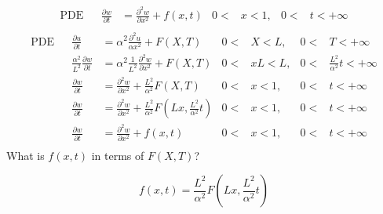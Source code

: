 \documentclass{article}
\begin{document}
\begin{enumerate}[(a)]
\begin{align*}
  \text{PDE}&&\frac{\partial w}{\partial t}&=\frac{\partial^2 w}{\partial x^2}+f(x,t)&0<&x<1,&0<&t<+\infty\\
\end{align*}
\begin{align*}
  \text{PDE}&&\frac{\partial u}{\partial t}&=\alpha^2\frac{\partial^2u}{\alpha x^2}+F(X,T)&0<&X<L,&0<&T<+\infty\\
  &&\frac{\alpha^2}{L^2}\frac{\partial w}{\partial t}&=\alpha^2\frac{1}{L^2}\frac{\partial ^2w}{\partial x^2}+F(X,T)&0<&xL<L,&0<&\frac{L^2}{\alpha^2}t<+\infty\\
  &&\frac{\partial w}{\partial t}&=\frac{\partial ^2w}{\partial x^2}+\frac{L^2}{\alpha^2}F(X,T)&0<&x<1,&0<&t<+\infty\\
  &&\frac{\partial w}{\partial t}&=\frac{\partial ^2w}{\partial x^2}+\frac{L^2}{\alpha^2}F\left(Lx,\frac{L^2}{\alpha^2}t\right)&0<&x<1,&0<&t<+\infty\\
  &&\frac{\partial w}{\partial t}&=\frac{\partial ^2w}{\partial x^2}+f(x,t)&0<&x<1,&0<&t<+\infty\\
\end{align*}
What is $f(x,t)$ in terms of $F(X,T)$?

\[f(x,t)=\frac{L^2}{\alpha^2}F\left(Lx,\frac{L^2}{\alpha^2}t\right)\]


\end{enumerate}
\end{document}
